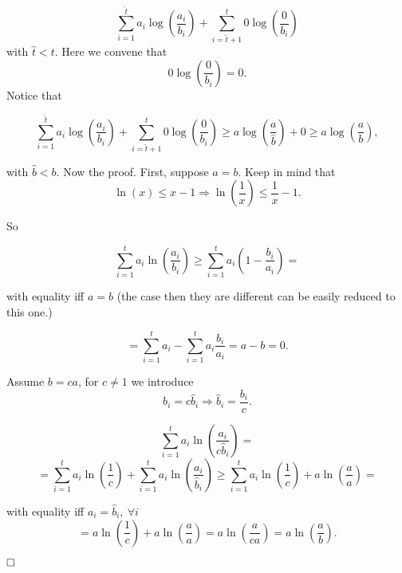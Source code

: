 \[
  \sum_{i= 1}^{\hat{t}}a_i\log\left(\dfrac{a_i}{b_i}\right)+ \sum_{i=\hat{t} + 1}^t 0\log\left(\dfrac{0}{b_i}\right)
 \]
 with $\hat{t} < t$. Here we convene that $$0\log\left(\dfrac{0}{b_i}\right) = 0.$$ Notice that 
 
\[
\sum_{i= 1}^{\hat{t}}a_i\log\left(\dfrac{a_i}{b_i}\right)+ \sum_{i=\hat{t} + 1}^t 0\log\left(\dfrac{0}{b_i}\right) \geq a\log\left(\dfrac{a}{\hat{b}}\right) + 0 \geq a\log\left(\dfrac{a}{b}\right),
\]

with $\hat{b} < b$. Now the proof. First, suppose $a=b$. Keep in mind that $$\ln(x)\leq x - 1\Rightarrow \ln\left(\dfrac{1}{x}\right)\leq \dfrac{1}{x} - 1.$$

So

\[
\sum_{i=1}^ta_i\ln\left(\dfrac{a_i}{b_i}\right) \geq \sum_{i=1}^ta_i\left(1-\dfrac{b_i}{a_i}\right) =  
\]

with equality iff $a=b$ (the case then they are different can be easily reduced to this one.)

\[
= \sum_{i = 1}^ta_i - \sum_{i=1}^ta_i\dfrac{b_i}{a_i} = a -b = 0.
\]

Assume $b = ca$, for $c \not=1$ we introduce $$b_i = c\hat{b}_i \Rightarrow \hat{b}_i = \dfrac{b_i}{c}.$$

\[
\sum_{i = 1}^t a_i\ln\left(\dfrac{a_i}{c\hat{b}_i} \right) = \]
\[ = \sum_{i=1}^{t}a_i\ln\left(\dfrac{1}{c} \right) + \sum_{i=1}^ta_i\ln\left(\dfrac{a_i}{\hat{b}_i} \right) \geq  \sum_{i=1}^{t}a_i\ln\left(\dfrac{1}{c} \right) + a\ln\left(\dfrac{a}{a} \right) = \]

with equality iff $a_i = \hat{b}_i,\ \forall i$
\[
 = a\ln\left(\dfrac{1}{c}\right) + a\ln\left(\dfrac{a}{a}\right) = a\ln\left(\dfrac{a}{ca} \right) = a\ln\left(\dfrac{a}{b} \right).
 \]
 
$\hfill\Box$